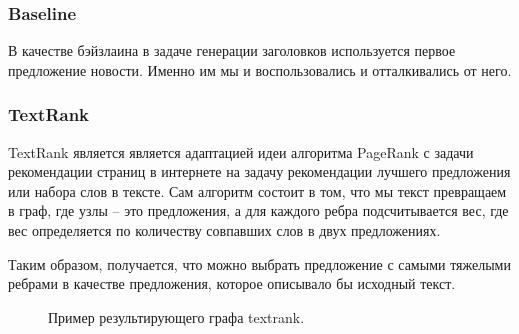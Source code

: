 \documentclass[aps,%
12pt,%
final,%
oneside,
onecolumn,%
musixtex, %
superscriptaddress,%
centertags]{article} %
\begin{document}
\subsubsection{Baseline}

В качестве бэйзлаина в задаче генерации заголовков используется первое предложение новости. Именно им мы и воспользовались и отталкивались от него.


\subsubsection{TextRank}

TextRank является является адаптацией идеи алгоритма PageRank \cite{Page98thepagerank} с задачи рекомендации страниц в интернете на задачу рекомендации лучшего предложения или набора слов в тексте. Сам алгоритм состоит в том, что мы текст превращаем в граф, где узлы -- это предложения, а для каждого ребра подсчитывается вес, где вес определяется по количеству совпавших слов в двух предложениях.

Таким образом, получается, что можно выбрать предложение с самыми тяжелыми ребрами в качестве предложения, которое описывало бы исходный текст.

\begin{figure}[ht]
\begin{center}


\caption{
\label{text_rank_example_graph}
        Пример результирующего графа textrank.}
\end {center}
\end {figure}
\end{document}
